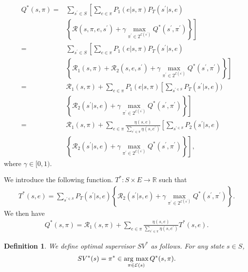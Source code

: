 \documentclass[letterpaper, 10 pt, conference]{ieeeconf}
\newtheorem{definition}{Definition}
\newcommand{\argmax}{\mathop{\rm arg~max}\limits}
\begin{document}
\begin{align}
  Q^{\ast}(s,\pi) = & \sum_{s^{\prime} \in S} \left[ \sum_{e \in \pi} P_1(e|s,\pi) P_T(s^{\prime}|s,e) \right. \nonumber \\
  & \left. \left \{ \mathcal{R}(s,\pi,e,s^{\prime}) + \gamma \max_{\pi^{\prime} \in 2^{\mathcal{E}(s^{\prime})}} Q^{\ast}(s^{\prime},\pi^{\prime}) \right \} \right] \nonumber \\
  = & \sum_{s^{\prime} \in S} \left[ \sum_{e \in \pi} P_1(e|s,\pi) P_T(s^{\prime}|s,e) \right. \nonumber \\
  & \left. \left \{ \mathcal{R}_1(s,\pi) + \mathcal{R}_2(s,e,s^{\prime}) + \gamma \max_{\pi^{\prime} \in 2^{\mathcal{E}(s^{\prime})}} Q^{\ast}(s^{\prime},\pi^{\prime}) \right \} \right] \nonumber \\
  = & \mathcal{R}_1(s,\pi) + \sum_{e \in \pi}P_1(e|s,\pi) \left[ \sum_{s^{\prime \in S}} P_T(s^{\prime}|s,e)) \right. \nonumber \\
  & \left. \left \{ \mathcal{R}_2(s^{\prime}|s,e) + \gamma \max_{\pi^{\prime} \in 2^{\mathcal{E}(s^{\prime})}} Q^{\ast}(s^{\prime}, \pi^{\prime}) \right \} \right] \nonumber \\
  = & \mathcal{R}_1(s,\pi) + \sum_{e \in \pi} \frac{\eta(s,e)}{\sum_{e^{\prime} \in \pi} \eta(s,e^{\prime})} \left[ \sum_{s^{\prime \in S}} P_2(s^{\prime}|s,e) \right. \nonumber \\
  & \left. \left \{ \mathcal{R}_2(s^{\prime}|s,e) + \gamma \max_{\pi^{\prime} \in 2^{\mathcal{E}(s^{\prime})}} Q^{\ast}(s^{\prime}, \pi^{\prime}) \right \} \right],
\end{align}
where $\gamma \in [0,1)$.

We introduce the following function. $T^{\ast} : S \times E \rightarrow \mathbb{R}$ such that
\begin{align}
  T^{\ast}(s,e) = \sum_{s^{\prime \in S}} P_T(s^{\prime}|s,e) \left \{ \mathcal{R}_2(s^{\prime}|s,e) + \gamma \max_{\pi^{\prime} \in 2^{\mathcal{E}(s^{\prime})}} Q^{\ast}(s^{\prime}, \pi^{\prime}) \right \}.
\end{align}
We then have
\begin{align}
  Q^{\ast}(s,\pi) = \mathcal{R}_1(s,\pi) + \sum_{e \in \pi} \frac{\eta(s,e)}{\sum_{e^{\prime} \in \pi} \eta(s,e^{\prime})} T^{\ast}(s,e).
\end{align}
\begin{definition}
We define optimal supervisor $SV^{\ast}$ as follows. For any state $s \in S$,
\begin{align}
  SV^{\ast}(s) = \pi^{\ast} \in \argmax_{\pi \in \mathcal{E}(s)} Q^{\ast}(s,\pi).
\end{align}
\end{definition}
\end{document}
